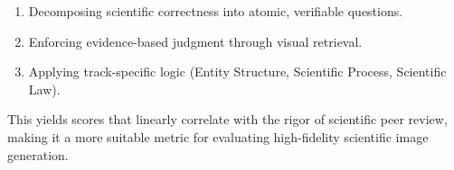 \documentclass[runningheads]{llncs}
\begin{document}
\begin{enumerate}
    \item Decomposing scientific correctness into atomic, verifiable questions.
    \item Enforcing evidence-based judgment through visual retrieval.
    \item Applying track-specific logic (Entity Structure, Scientific Process, Scientific Law).
\end{enumerate}

This yields scores that linearly correlate with the rigor of scientific peer review, making it a more suitable metric for evaluating high-fidelity scientific image generation.



\end{document}
